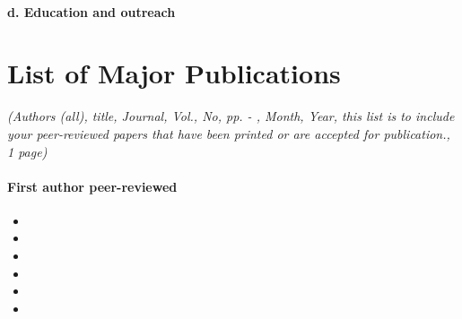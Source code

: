 \documentclass{article}
\begin{document}

\paragraph{d. Education and outreach}



\section{List of Major Publications}

    \emph{(Authors (all), title, Journal,  Vol., No, pp.   -   , Month, Year,
          this list is to include your peer-reviewed papers that have been printed or
          are accepted for publication., 1 page)}

\paragraph{First author peer-reviewed}

    

    \begin{itemize}
      \item{}
      \item{}
      \item{}
      \item{}
      \item{}
      \item{}
    \end{itemize}
\end{document}
